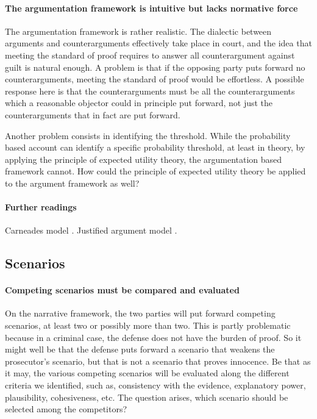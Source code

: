 \documentclass[10pt]{article}
\begin{document}
\paragraph{The argumentation framework is intuitive but lacks normative force}


The argumentation framework is rather realistic. The dialectic between arguments and 
counterarguments effectively take place in court, and the idea that meeting the standard of proof requires to answer all 
counterargument against guilt is natural enough. A problem is that if the opposing party puts forward no counterarguments, meeting the standard of proof would be effortless. A possible response here is that the counterarguments must be all the counterarguments which a reasonable objector could in principle put forward, not just 
the counterarguments that in fact are put forward. %

Another problem consists in identifying the threshold. While the probability based account can identify a specific probability threshold, 
at least in theory, by applying the principle of expected utility theory, the argumentation based framework cannot. 
How could the principle of expected utility theory be applied to the argument framework as well?



\paragraph{Further readings}
Carneades model \citep{gordonEtal2007, gordon2009}.
Justified argument model \citep{prakkenSartor2007, prakken2009}.



\subsection{Scenarios}


\paragraph{Competing scenarios must be compared and evaluated}

On the narrative framework, the two parties will put forward competing scenarios, at least two or possibly more than two. This is partly problematic because in a criminal case, the defense does not have the burden of proof. So it might well be that the defense puts forward a scenario that weakens the prosecutor's scenario, but that is not 
a scenario that proves innocence. Be that as it may, the various competing scenarios will be evaluated along the different criteria we identified, such as, consistency with the evidence, explanatory power, plausibility, cohesiveness, etc. The question arises, which scenario should be selected among the competitors?
\end{document}
